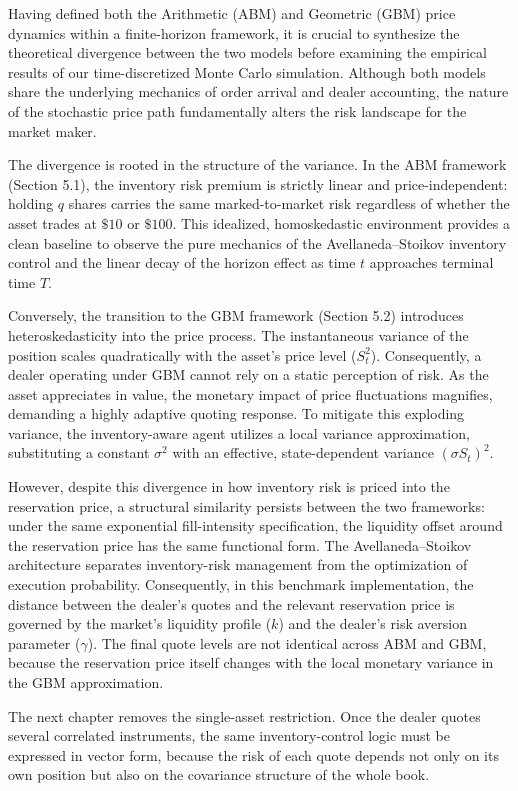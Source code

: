 \documentclass[a4paper,10pt,titlepage,oneside,openany]{book}
\theoremstyle{plain}\newtheorem{theorem}{Theorem}[chapter]
\theoremstyle{definition}\newtheorem{definition}{Definition}[chapter]
\theoremstyle{remark}\newtheorem{remark}{Remark}[chapter]
\begin{document}
Having defined both the Arithmetic (ABM) and Geometric (GBM) price dynamics within a finite-horizon framework, it is crucial to synthesize the theoretical divergence between the two models before examining the empirical results of our time-discretized Monte Carlo simulation. Although both models share the underlying mechanics of order arrival and dealer accounting, the nature of the stochastic price path fundamentally alters the risk landscape for the market maker.

The divergence is rooted in the structure of the variance. In the ABM framework (Section 5.1), the inventory risk premium is strictly linear and price-independent: holding $q$ shares carries the same marked-to-market risk regardless of whether the asset trades at $\$10$ or $\$100$. This idealized, homoskedastic environment provides a clean baseline to observe the pure mechanics of the Avellaneda--Stoikov inventory control and the linear decay of the horizon effect as time $t$ approaches terminal time $T$.

Conversely, the transition to the GBM framework (Section 5.2) introduces heteroskedasticity into the price process. The instantaneous variance of the position scales quadratically with the asset's price level ($S_t^2$). Consequently, a dealer operating under GBM cannot rely on a static perception of risk. As the asset appreciates in value, the monetary impact of price fluctuations magnifies, demanding a highly adaptive quoting response. To mitigate this exploding variance, the inventory-aware agent utilizes a local variance approximation, substituting a constant $\sigma^2$ with an effective, state-dependent variance $(\sigma S_t)^2$.

However, despite this divergence in how inventory risk is priced into the reservation price, a structural similarity persists between the two frameworks: under the same exponential fill-intensity specification, the liquidity offset around the reservation price has the same functional form. The Avellaneda--Stoikov architecture separates inventory-risk management from the optimization of execution probability. Consequently, in this benchmark implementation, the distance between the dealer's quotes and the relevant reservation price is governed by the market's liquidity profile ($k$) and the dealer's risk aversion parameter ($\gamma$). The final quote levels are not identical across ABM and GBM, because the reservation price itself changes with the local monetary variance in the GBM approximation.

The next chapter removes the single-asset restriction. Once the dealer quotes several correlated instruments, the same inventory-control logic must be expressed in vector form, because the risk of each quote depends not only on its own position but also on the covariance structure of the whole book.
\end{document}

